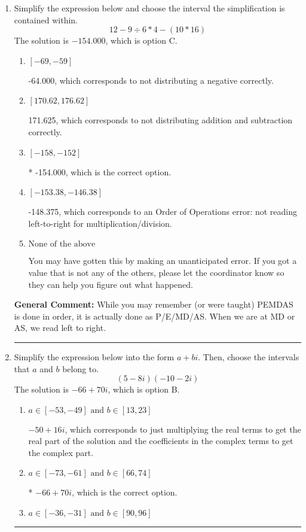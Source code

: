 \documentclass{extbook}[14pt]
\newcommand{\litem}[1]{\item #1

\rule{\textwidth}{0.4pt}}
\begin{document}
\begin{enumerate}
{ Irrational numbers are more than just square root of 3: adding or subtracting values from square root of 3 is also irrational.
}
\litem{
Simplify the expression below and choose the interval the simplification is contained within.
\[ 12 - 9 \div 6 * 4 - (10 * 16) \]The solution is \( -154.000 \), which is option C.\begin{enumerate}[label=\Alph*.]
\item \( [-69, -59] \)

 -64.000, which corresponds to not distributing a negative correctly.
\item \( [170.62, 176.62] \)

 171.625, which corresponds to not distributing addition and subtraction correctly.
\item \( [-158, -152] \)

* -154.000, which is the correct option.
\item \( [-153.38, -146.38] \)

 -148.375, which corresponds to an Order of Operations error: not reading left-to-right for multiplication/division.
\item \( \text{None of the above} \)

 You may have gotten this by making an unanticipated error. If you got a value that is not any of the others, please let the coordinator know so they can help you figure out what happened.
\end{enumerate}

\textbf{General Comment:} While you may remember (or were taught) PEMDAS is done in order, it is actually done as P/E/MD/AS. When we are at MD or AS, we read left to right.
}
\litem{
Simplify the expression below into the form $a+bi$. Then, choose the intervals that $a$ and $b$ belong to.
\[ (5 - 8 i)(-10 - 2 i) \]The solution is \( -66 + 70 i \), which is option B.\begin{enumerate}[label=\Alph*.]
\item \( a \in [-53, -49] \text{ and } b \in [13, 23] \)

 $-50 + 16 i$, which corresponds to just multiplying the real terms to get the real part of the solution and the coefficients in the complex terms to get the complex part.
\item \( a \in [-73, -61] \text{ and } b \in [66, 74] \)

* $-66 + 70 i$, which is the correct option.
\item \( a \in [-36, -31] \text{ and } b \in [90, 96] \)


\end{enumerate}}
\end{enumerate}
\end{document}
